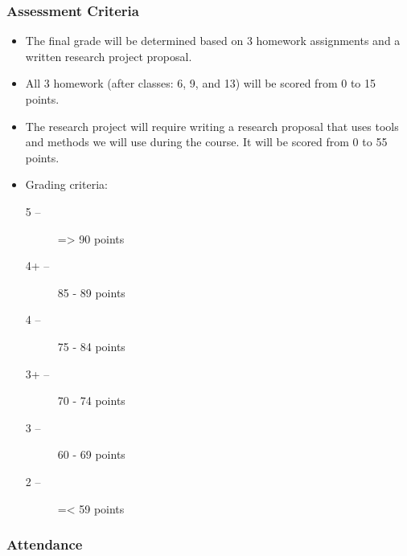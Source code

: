 \documentclass{beamer}
\begin{document}
\begin{frame}
    \frametitle{Assessment Criteria}
    \begin{itemize}
        \item The final grade will be determined based on \alert{3 homework
        assignments} and a \alert{written research project proposal}.
        \item All 3 homework (after classes: 6, 9, and 13) will be scored from 0
        to 15 points.
        \item The research project will require writing a research proposal that
        uses tools and methods we will use during the course. It will be scored
        from 0 to 55 points.
        \item Grading criteria:
    \begin{description}
        \item [5\phantom{+} --] => 90 points
        \item [4+ --] 85 - 89 points
        \item [4\phantom{+} --] 75 - 84 points
        \item [3+ --] 70 - 74 points
        \item [3\phantom{+} --] 60 - 69 points
        \item [2\phantom{+} --] =< 59 points
    \end{description}
\end{itemize}
\end{frame}
\begin{frame}
    \frametitle{Attendance}
\end{frame}
\end{document}
